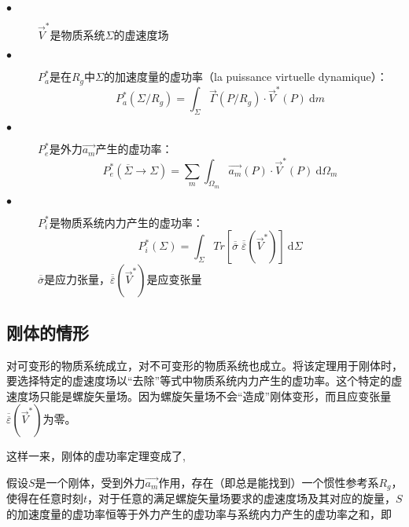 \documentclass[UTF8]{ctexart}%
\begin{document}
\begin{description}
  \item[$\bullet$] $\overrightarrow{V}^{\ast}$是物质系统$\Sigma$的虚速度场
  \item[$\bullet$] $P_a^{\ast}$是在$R_g$中$\Sigma$的加速度量的虚功率（la puissance virtuelle dynamique）：
									\begin{equation}					 
									P_a^{\ast}\left(\Sigma/R_g\right)=\int_{\Sigma}\overrightarrow{\Gamma}\left(P/R_g\right)\cdot\overrightarrow{V}^{\ast}\left(P\right)\ \mathrm{d}m
									\end{equation}
  \item[$\bullet$] $P_e^{\ast}$是外力$\overrightarrow{a_m}$产生的虚功率：
									\begin{equation}					 
									P_e^{\ast}\left(\overline{\Sigma}\rightarrow\Sigma\right)=\sum_{m}\int_{\Omega_m}\overrightarrow{a_m}\left(P\right)\cdot\overrightarrow{V}^{\ast}\left(P\right)\ \mathrm{d}\Omega_m
									\end{equation}
									
  \item[$\bullet$] $P_i^{\ast}$是物质系统内力产生的虚功率：
									\begin{equation}					 
									P_i^{\ast}\left(\Sigma\right)=\int_{\Sigma}Tr[\overline{\overline{\sigma}}\;\overline{\overline{\varepsilon}}(\overrightarrow{V}^{\ast})]\ \mathrm{d}\Sigma
									\end{equation}
									$\overline{\overline{\sigma}}$是应力张量，$\overline{\overline{\varepsilon}}(\overrightarrow{V}^{\ast})$是应变张量
\end{description}


\subsection{刚体的情形}
\label{sec:刚体的情形}
对可变形的物质系统成立，对不可变形的物质系统也成立。将该定理用于刚体时，要选择特定的虚速度场以“去除”等式中物质系统内力产生的虚功率。这个特定的虚速度场只能是螺旋矢量场。因为螺旋矢量场不会“造成”刚体变形，而且应变张量$\overline{\overline{\varepsilon}}(\overrightarrow{V}^{\ast})$为零。

这样一来，刚体的虚功率定理变成了,

假设$S$是一个刚体，受到外力$\overrightarrow{a_m}$作用，存在（即总是能找到）一个惯性参考系$R_g$，使得在任意时刻$t$，对于任意的满足螺旋矢量场要求的虚速度场及其对应的旋量，$S$的加速度量的虚功率恒等于外力产生的虚功率与系统内力产生的虚功率之和，即
\end{document}
